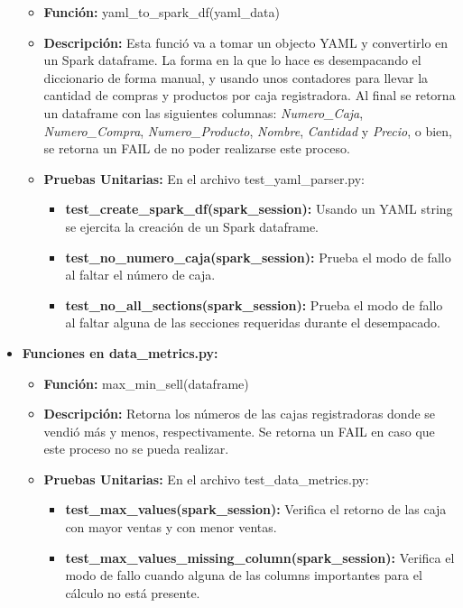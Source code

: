\documentclass[a4paper]{article}
\begin{document}
\begin{itemize}
        \begin{itemize}
            \item \textbf{Funci\'{o}n:} yaml\_to\_spark\_df(yaml\_data)
            \item \textbf{Descripci\'{o}n:} Esta funci\'{o} va a tomar un objecto YAML y convertirlo en un Spark dataframe. La forma en la que lo hace es desempacando el diccionario de forma manual, y usando unos contadores para llevar la cantidad de compras y productos por caja registradora. Al final se retorna un dataframe con las siguientes columnas: \textit{Numero\_Caja}, \textit{Numero\_Compra}, \textit{Numero\_Producto}, \textit{Nombre}, \textit{Cantidad} y \textit{Precio}, o bien, se retorna un FAIL de no poder realizarse este proceso.
            \item \textbf{Pruebas Unitarias:} En el archivo test\_yaml\_parser.py:
                \begin{itemize}
                    \item \textbf{test\_create\_spark\_df(spark\_session):} Usando un YAML string se ejercita la creaci\'{o}n de un Spark dataframe.
                    \item \textbf{test\_no\_numero\_caja(spark\_session):} Prueba el modo de fallo al faltar el n\'{u}mero de caja.
                    \item \textbf{test\_no\_all\_sections(spark\_session):} Prueba el modo de fallo al faltar alguna de las secciones requeridas durante el desempacado.
                \end{itemize}
        \end{itemize}

    \item \textbf{Funciones en data\_metrics.py:}
        \begin{itemize}
            \item \textbf{Funci\'{o}n:} max\_min\_sell(dataframe)
            \item \textbf{Descripci\'{o}n:} Retorna los n\'{u}meros de las cajas registradoras donde se vendi\'{o} m\'{a}s y menos, respectivamente. Se retorna un FAIL en caso que este proceso no se pueda realizar.
            \item \textbf{Pruebas Unitarias:} En el archivo test\_data\_metrics.py:
                \begin{itemize}
                    \item \textbf{test\_max\_values(spark\_session):} Verifica el retorno de las caja con mayor ventas y con menor ventas.
                    \item \textbf{test\_max\_values\_missing\_column(spark\_session):} Verifica el modo de fallo cuando alguna de las columns importantes para el c\'{a}lculo no est\'{a} presente.
                \end{itemize}
        \end{itemize}


\end{itemize}
\end{document}
